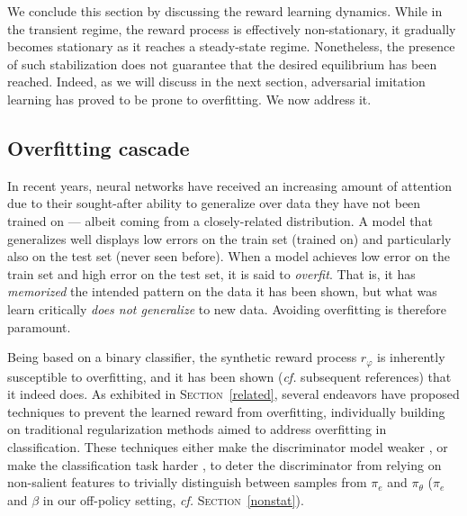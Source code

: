 We conclude this section by  discussing the reward learning dynamics.
While in the transient regime, the reward process is effectively non-stationary,
it gradually becomes stationary
as it reaches a steady-state regime.
Nonetheless, the presence of such stabilization does not guarantee that the desired
equilibrium has been reached.
Indeed, as we will discuss in the next section,
adversarial imitation learning has proved to be prone to overfitting.
We now address it.

\subsection{Overfitting cascade}
\label{overfitting}

In recent years, neural networks have received an increasing amount of attention
due to their sought-after ability to generalize over data they have not been trained on
--- albeit coming from a closely-related distribution.
A model that generalizes well displays low errors on the train set (trained on)
and particularly also on the test set (never seen before).
When a model achieves low error on the train set and high error on the test set, it is said to \emph{overfit}.
That is, it has \emph{memorized} the intended pattern on the data it has been shown,
but what was learn critically \emph{does not generalize} to new data. Avoiding overfitting is therefore paramount.

Being based on a binary classifier, the synthetic reward process $r_\varphi$ is
inherently susceptible to overfitting, and it has been shown (\textit{cf.} subsequent references)
that it indeed does.
As exhibited in \textsc{Section}~\ref{related},
several endeavors have proposed techniques to prevent the learned reward from overfitting,
individually building on traditional regularization methods aimed to address overfitting
in classification.
These techniques either make the discriminator model weaker
\cite{Reed2018-ga,Blonde2019-vc,Kostrikov2019-jo,Peng2018-mo},
or make the classification task harder
\cite{Blonde2019-vc,Xu2019-uo,Zolna2019-wj},
to deter the discriminator from relying on non-salient features
to trivially distinguish between samples from $\pi_e$ and $\pi_\theta$
($\pi_e$ and $\beta$ in our off-policy setting, \textit{cf.} \textsc{Section}~\ref{nonstat}).

